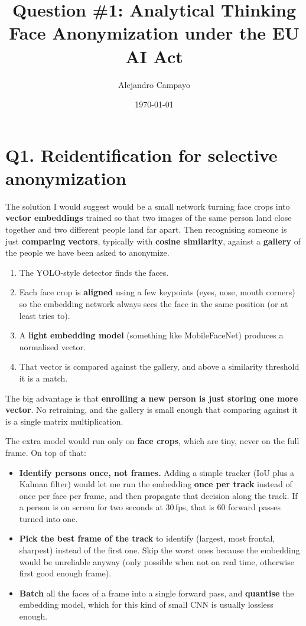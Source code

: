 \documentclass[11pt,a4paper]{article}
\title{Question \#1: Analytical Thinking \\ Face Anonymization under the EU AI Act}
\author{Alejandro Campayo}
\date{\today}
\begin{document}
\maketitle

\section*{Q1. Reidentification for selective anonymization}

The solution I would suggest would be a small network turning face crops into
\textbf{vector embeddings} trained so that two images of the same person land close
together and two different people land far apart. Then recognising someone is just
\textbf{comparing vectors}, typically with \textbf{cosine similarity}, against a
\textbf{gallery} of the people we have been asked to anonymize.

\begin{enumerate}
  \item The YOLO-style detector finds the faces.
  \item Each face crop is \textbf{aligned} using a few keypoints (eyes, nose, mouth corners)
    so the embedding network always sees the face in the same position (or at least tries to).
  \item A \textbf{light embedding model} (something like MobileFaceNet) produces a normalised vector.
  \item That vector is compared against the gallery, and above a similarity threshold it is a match.
\end{enumerate}

The big advantage is that \textbf{enrolling a new person is just storing one more
vector}. No retraining, and the gallery is small enough that comparing against it is a single matrix multiplication.

The extra model would run only on \textbf{face crops}, which are tiny, never on the full frame.
On top of that:

\begin{itemize}
  \item \textbf{Identify persons once, not frames.} Adding a simple tracker (IoU plus a Kalman
    filter) would let me run the embedding \textbf{once per track} instead of once
    per face per frame, and then propagate that decision along the track. If a person is on
    screen for two seconds at 30\,fps, that is 60 forward passes turned into one. 
  \item \textbf{Pick the best frame of the track} to identify (largest, most frontal,
    sharpest) instead of the first one. Skip the worst ones because the embedding would be unreliable anyway (only possible when not on real time, otherwise first good enough frame).
  \item \textbf{Batch} all the faces of a frame into a single forward pass, and
    \textbf{quantise} the embedding model, which for this kind of small CNN is usually
    lossless enough.
\end{itemize}
\end{document}
